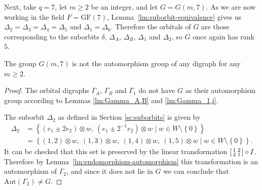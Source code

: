 \documentclass[ALCO, Unicode]{cedram}
\newcommand{\Aut}{\mathrm{Aut}}
\newcommand{\GF}{\mathrm{GF}}
\begin{document}
Next, take $q=7$, let $m \geqslant 2$ be an integer, and let $G = G{\left(m, 7 \right)}$. As we are now working in the field $F = \GF {\left(7 \right)}$, Lemma~\ref{lm:suborbit-equivalence} gives us $\Delta_2 = \Delta_3 = \Delta_4 = \Delta_5$ and $\Delta_1 = \Delta_6$. Therefore the orbitals of $G$ are those corresponding to the suborbits $\delta$, $\Delta_A$, $\Delta_B$, $\Delta_1$ and $\Delta_2$, so $G$ once again has rank $5$.

\begin{theorem} \label{thm:q=7}
The group $G{\left(m, 7 \right)}$ is not the automorphism group of any digraph for any $m \geqslant 2$.
\end{theorem}
\begin{proof}
The orbital digraphs $\Gamma_A$, $\Gamma_B$ and $\Gamma_1$ do not have $G$ as their automorphism group according to Lemmas \ref{lm:Gamma_A,B} and \ref{lm:Gamma_1,i}.

The suborbit $\Delta_2$ as defined in Section \ref{sc:suborbits} is given by
\begin{align*}
\Delta_2 &= \left\{\left(e_1 \pm 2 e_2 \right) \otimes w,\ \left(e_1 \pm 2^{-1} e_2 \right) \otimes w \mid w \in W \setminus \left\{0 \right\}\right\} \\
&= \left\{\left(1, 2 \right) \otimes w,\ \left(1, 3 \right) \otimes w,\ \left(1, 4 \right) \otimes w,\ \left(1, 5 \right) \otimes w \mid w \in W \setminus \left\{0 \right\}\right\}.
\end{align*}
It can be checked that this set is preserved by the linear transformation $\begin{bsmallmatrix} 1 & 2 \\ 2 & 1 \end{bsmallmatrix} \circ I$. Therefore by Lemma~\ref{lm:endomorphism-automorphism} this transformation is an automorphism of $\Gamma_2$, and since it does not lie in $G$ we can conclude that $\Aut(\Gamma_2) \neq G$.


\end{proof}
\end{document}
